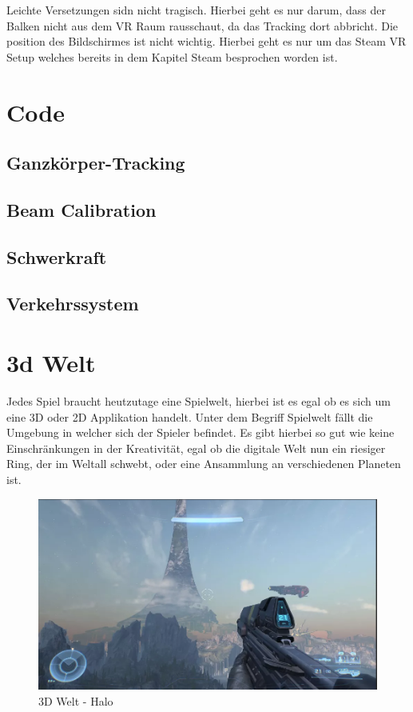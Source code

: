 Leichte Versetzungen sidn nicht tragisch. Hierbei geht es nur darum, dass der Balken nicht aus dem VR Raum
rausschaut, da das Tracking dort abbricht. Die position des Bildschirmes ist nicht wichtig.
Hierbei geht es nur um das Steam VR Setup welches bereits in dem Kapitel Steam besprochen worden ist.

\section{Code}\label{sec:code}
\subsection{Ganzkörper-Tracking}\label{sec:full-body-tracking}
\subsection{Beam Calibration}\label{subsec:beam-calibration}
\subsection{Schwerkraft}\label{subsec:gravity}
\subsection{Verkehrssystem}\label{subsec:traffic-system}


\section{3d Welt}\label{sec:3d-world}
Jedes Spiel braucht heutzutage eine Spielwelt, hierbei ist es egal ob es sich um eine 3D oder 2D Applikation handelt.
Unter dem Begriff Spielwelt fällt die Umgebung in welcher sich der Spieler befindet.
Es gibt hierbei so gut wie keine Einschränkungen in der Kreativität, egal ob die digitale Welt nun ein riesiger Ring, der im Weltall schwebt,
oder eine Ansammlung an verschiedenen Planeten ist.
~\cite{GamesRadar_HaloRing_2022}



\begin{figure}
    \centering
    \includegraphics[scale=0.4]{pics/3d_welt_halo_ring}
    \caption{3D Welt - Halo}
    \label{fig:3d_environment_halo}
\end{figure}


